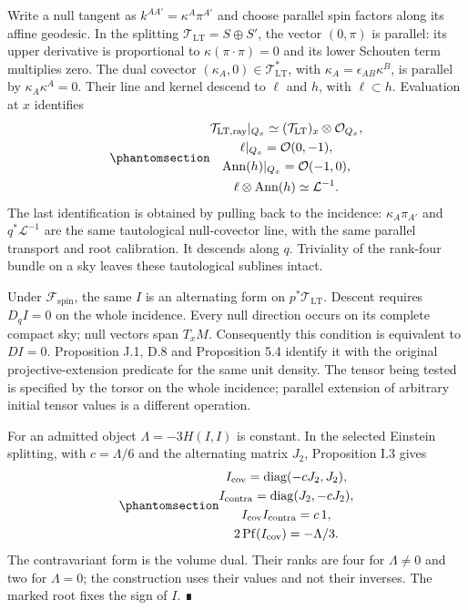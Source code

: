 \documentclass[
  english,
  11pt,
  reqno]{amsart}
\begin{document}
Write a null tangent as \(k^{AA'}=\kappa^A\pi^{A'}\) and choose parallel
spin factors along its affine geodesic. In the splitting
\(\mathcal T_{\mathrm{LT}}=S\oplus S'\), the vector \((0,\pi)\) is
parallel: its upper derivative is proportional to
\(\kappa(\pi\cdot\pi)=0\) and its lower Schouten term multiplies zero.
The dual covector \((\kappa_A,0)\in \mathcal T_{\mathrm{LT}}^*\), with
\(\kappa_A=\epsilon_{AB}\kappa^B\), is parallel by
\(\kappa_A\kappa^A=0\). Their line and kernel descend to \(\ell\) and
\(h\), with \(\ell\subset h\). Evaluation at \(x\) identifies
\begin{equation}\protect\phantomsection\label{eq:gg-ward-flag-lines}{\begin{gathered}
\mathcal T_{\mathrm{LT,ray}}|_{Q_x}\simeq (\mathcal T_{\mathrm{LT}})_x\otimes\mathcal O_{Q_x}, \\
\ell|_{Q_x}=\mathcal O(0,-1), \\
\operatorname{Ann}(h)|_{Q_x}=\mathcal O(-1,0), \\
\ell\otimes\operatorname{Ann}(h)\simeq\mathcal L^{-1}.
\end{gathered}}\end{equation} The last identification is obtained by pulling back to
the incidence: \(\kappa_A\pi_{A'}\) and \(q^*\mathcal L^{-1}\) are the
same tautological null-covector line, with the same parallel transport
and root calibration. It descends along \(q\). Triviality of the
rank-four bundle on a sky leaves these tautological sublines intact.

Under \(\mathcal F_{\mathrm{spin}}\), the same \(I\) is an alternating
form on \(p^*\mathcal T_{\mathrm{LT}}\). Descent requires \(D_qI=0\) on
the whole incidence. Every null direction occurs on its complete compact
sky; null vectors span \(T_xM\). Consequently this condition is
equivalent to \(DI=0\). Proposition J.1, D.8 and Proposition 5.4
identify it with the original projective-extension predicate for the
same unit density. The tensor being tested is specified by the torsor on
the whole incidence; parallel extension of arbitrary initial tensor
values is a different operation.

For an admitted object \(\Lambda=-3H(I,I)\) is constant. In the selected
Einstein splitting, with \(c=\Lambda/6\) and the alternating matrix
\(J_2\), Proposition I.3 gives
\begin{equation}\protect\phantomsection\label{eq:gg-ward-infinity-pair}{\begin{gathered}
I_{\mathrm{cov}}=\operatorname{diag}(-cJ_2,J_2), \\
I_{\mathrm{contra}}=\operatorname{diag}(J_2,-cJ_2), \\
I_{\mathrm{cov}}I_{\mathrm{contra}}=c\,1, \\
2\operatorname{Pf}(I_{\mathrm{cov}})=-\Lambda/3.
\end{gathered}}\end{equation} The contravariant form is the volume dual. Their ranks
are four for \(\Lambda\ne0\) and two for \(\Lambda=0\); the construction
uses their values and not their inverses. The marked root fixes the sign
of \(I\). ∎
\end{document}
